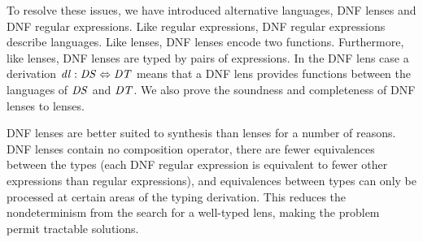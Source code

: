 \documentclass[a4paper,twoside]{article}
\begin{document}
To resolve these issues, we have introduced alternative languages, DNF lenses
and DNF regular expressions.  Like regular expressions, DNF regular expressions
describe languages.  Like lenses, DNF lenses encode two functions.  Furthermore,
like lenses, DNF lenses are typed by pairs of expressions.  In the DNF lens case
a derivation $\mathit{dl} : \mathit{DS} \Leftrightarrow \mathit{DT}$ means
that a DNF lens provides functions between the languages of $\mathit{DS}$ and $\mathit{DT}$.
We also prove the soundness and completeness of DNF lenses to lenses.

DNF lenses are better suited to synthesis than lenses for a number of reasons.
DNF lenses contain no composition operator, there are fewer equivalences between
the types (each DNF regular expression is equivalent to fewer other
expressions than regular expressions), and equivalences between types can only
be processed at certain areas of the typing derivation.  This reduces the
nondeterminism from the search for a well-typed lens, making the problem permit
tractable solutions.
\end{document}
